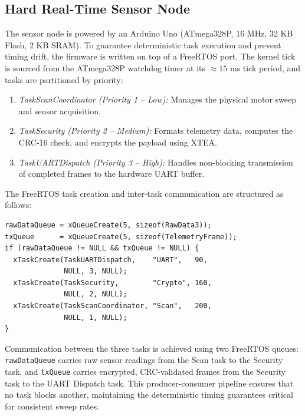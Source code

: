 \documentclass[conference]{IEEEtran}
\begin{document}
\subsection{Hard Real-Time Sensor Node}
\label{subsec:sensor_node}
The sensor node is powered by an Arduino Uno (ATmega328P, 16 MHz, 32 KB Flash, 2 KB SRAM). To guarantee deterministic task execution and prevent timing drift, the firmware is written on top of a FreeRTOS port. The kernel tick is sourced from the ATmega328P watchdog timer at its $\approx 15\text{ ms}$ tick period, and tasks are partitioned by priority:

\begin{enumerate}
    \item \textit{TaskScanCoordinator (Priority 1 -- Low):} Manages the physical motor sweep and sensor acquisition.
    \item \textit{TaskSecurity (Priority 2 -- Medium):} Formats telemetry data, computes the CRC-16 check, and encrypts the payload using XTEA.
    \item \textit{TaskUARTDispatch (Priority 3 -- High):} Handles non-blocking transmission of completed frames to the hardware UART buffer.
\end{enumerate}

The FreeRTOS task creation and inter-task communication are structured as follows:

\begin{lstlisting}[style=cppstyle, caption={FreeRTOS task initialization on the sensor node.}, label={lst:freertos_init}]
rawDataQueue = xQueueCreate(5, sizeof(RawData3));
txQueue      = xQueueCreate(5, sizeof(TelemetryFrame));
if (rawDataQueue != NULL && txQueue != NULL) {
  xTaskCreate(TaskUARTDispatch,    "UART",   90,
              NULL, 3, NULL);
  xTaskCreate(TaskSecurity,        "Crypto", 160,
              NULL, 2, NULL);
  xTaskCreate(TaskScanCoordinator, "Scan",   200,
              NULL, 1, NULL);
}
\end{lstlisting}

Communication between the three tasks is achieved using two FreeRTOS queues: \texttt{rawDataQueue} carries raw sensor readings from the Scan task to the Security task, and \texttt{txQueue} carries encrypted, CRC-validated frames from the Security task to the UART Dispatch task. This producer-consumer pipeline ensures that no task blocks another, maintaining the deterministic timing guarantees critical for consistent sweep rates.
\end{document}

